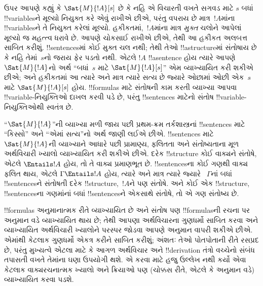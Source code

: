 \documentclass[../../../include/open-logic-section]{subfiles}
\begin{document}


ઉપર આપણે કહ્યું કે $\Sat{M}{!A}[s]$ છે કે નહિ એ વિચારતી વખતે સગવડ
માટે $s$ બધાં !!{variable}sને મૂલ્યો નિયુક્ત કરે એવું રાખીએ છીએ, પરંતુ
વપરાય છે માત્ર~$!A$માંના !!{variable}sને તે નિયુક્ત કરેલાં મૂલ્યો.
હકીકતમાં,~$!A$માંના માત્ર \emph{મુક્ત} ચલોને આપેલાં મૂલ્યો જ મહત્ત્વ
ધરાવે છે. આપણે ચોકસાઈ રાખીએ છીએ, તેથી આ હકીકત અલબત્ત સાબિત કરીશું.
!!{sentence}sમાં કોઈ મુક્ત ચલ નથી; તેથી તેઓ !!a{structure}માં સંતોષાય
છે કે નહિ તેમાં~$s$નો જરાય ફેર પડતો નથી. એટલે $!A$ !!a{sentence} હોય
ત્યારે આપણે $\Sat{M}{!A}$નો અર્થ ``બધાં~$s$ માટે
$\Sat{M}{!A}[s]$'' એમ વ્યાખ્યાયિત કરી શકીએ છીએ; અને હકીકતમાં આ ત્યારે
અને માત્ર ત્યારે સત્ય છે જ્યારે ઓછામાં ઓછી એક~$s$ માટે
$\Sat{M}{!A}[s]$ હોય. !!{formula}s માટે સંતોષની કામ કરતી વ્યાખ્યા
આપવા !!{variable}-નિયુક્તિઓ દાખલ કરવી પડે છે, પરંતુ !!{sentence}s
માટેનો સંતોષ !!{variable}-નિયુક્તિઓથી સ્વતંત્ર છે.

``$\Sat{M}{!A}$''ની વ્યાખ્યા મળી જાય પછી પ્રથમ-ક્રમ તર્કશાસ્ત્રનાં
!!{sentence}s માટે ``કિસ્સો'' અને ``એમાં સત્ય''નો અર્થ જાણી લઈએ છીએ.
!!{sentence}s માટે $\Sat{M}{!A}$ની વ્યાખ્યાને આધારે પછી પ્રામાણ્ય,
ફલિતતા અને સંતોષ્યતાના મૂળ અર્થવિચારી ખ્યાલો વ્યાખ્યાયિત કરી શકીએ
છીએ. દરેક !!{structure} કોઈ વાક્યને સંતોષે, એટલે $\Entails !A$ હોય,
તો તે વાક્ય પ્રમાણભૂત છે. !!{sentence}sના કોઈ ગણથી વાક્ય ફલિત થાય,
એટલે $\Gamma \Entails !A$ હોય, ત્યારે અને માત્ર ત્યારે જ્યારે
~$\Gamma$નાં બધાં !!{sentence}sને સંતોષતી દરેક !!{structure},~$!A$ને
પણ સંતોષે. અને કોઈ એક !!{structure}, !!{sentence}sના ગણમાંનાં બધાં
!!{sentence}sને એકસાથે સંતોષે, તો એ ગણ સંતોષ્ય છે.

!!{formula}s અનુમાનાત્મક રીતે વ્યાખ્યાયિત છે અને સંતોષ પણ
!!{formula}sની રચના પર અનુમાન વડે વ્યાખ્યાયિત થાય છે; તેથી આપણા
અર્થવિચારના ગુણધર્મો સાબિત કરવા અને વ્યાખ્યાયિત અર્થવિચારી ખ્યાલોને
પરસ્પર જોડવા આપણે અનુમાન વાપરી શકીએ છીએ. એમાંથી કેટલાક ગુણધર્મો
એકત્ર કરીને સાબિત કરીશું; અંશતઃ તેઓ પોતપોતાની રીતે રસપ્રદ છે, પરંતુ
મુખ્યત્વે એટલા માટે કે આગળ અર્થવિચાર અને !!{derivation} તંત્રો વચ્ચેનો
સંબંધ તપાસતી વખતે તેમાંના ઘણા ઉપયોગી થશે. એ કરવા માટે હજુ ઉલ્લેખ
નથી કર્યો એવા કેટલાક વાક્યરચનાત્મક ખ્યાલો અને ક્રિયાઓ પણ (ચોક્કસ
રીતે, એટલે કે અનુમાન વડે) વ્યાખ્યાયિત કરવા પડશે.
\end{document}
